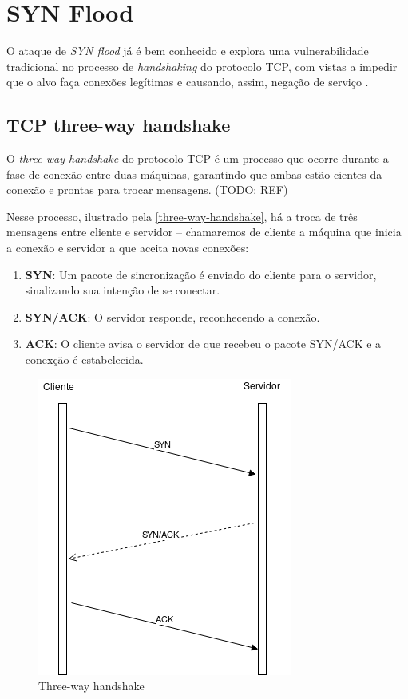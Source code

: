 
\section{SYN Flood}

O ataque de \emph{SYN flood} já é bem conhecido e explora uma vulnerabilidade tradicional no processo de \emph{handshaking} do protocolo TCP, com vistas a impedir que o alvo faça conexões legítimas e causando, assim, negação de serviço \cite{Yuan2008}.


\subsection{TCP three-way handshake}
O \emph{three-way handshake} do protocolo TCP é um processo que ocorre durante a fase de conexão entre duas máquinas, garantindo que ambas estão cientes da conexão e prontas para trocar mensagens. (TODO: REF)

Nesse processo, ilustrado pela \autoref{three-way-handshake}, há a troca de três mensagens entre cliente e servidor -- chamaremos de cliente a máquina que inicia a conexão e servidor a que aceita novas conexões:

\begin{enumerate}
  \item \textbf{SYN}: Um pacote de sincronização é enviado do cliente para o servidor, sinalizando sua intenção de se conectar.
  \item \textbf{SYN/ACK}: O servidor responde, reconhecendo a conexão.
  \item \textbf{ACK}: O cliente avisa o servidor de que recebeu o pacote SYN/ACK e a conexção é estabelecida.
\end{enumerate}




\begin{figure}[htb]
 \caption{Three-way handshake}
 \label{three-way-handshake}
 \centering
 \includegraphics[scale=0.6]{images/three-way-handshake.png}
 \fautor
\end{figure}




